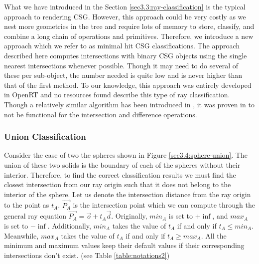 \documentclass[a4paper,11pt,oneside]{article}
\begin{document}
What we have introduced in the Section \ref{sec3.3:ray-classification} is the typical approach to rendering CSG. However, this approach could be very costly as we nest more geometries in the tree and require lots of memory to store, classify, and combine a long chain of operations and primitives. Therefore, we introduce a new approach which we refer to as minimal hit CSG classifications. The approach described here computes intersections with binary CSG objects using the single nearest intersections whenever possible. Though it may need to do several of these per sub-object, the number needed is quite low and is never higher than that of the first method. To our knowledge, this approach was entirely developed in OpenRT and no resources found describe this type of ray classification. Though a relatively similar algorithm has been introduced in \cite{kensler_ray_2006}, it was proven in \cite{csg-xrt-renderer} to not be functional for the intersection and difference operations.

\subsubsection{Union Classification}

Consider the case of two the spheres shown in Figure \ref{sec3.4:sphere-union}. The union of these two solids is the boundary of each of the spheres without their interior. Therefore, to find the correct classification results we must find the closest intersection from our ray origin such that it does not belong to the interior of the sphere. Let us denote the intersection distance from the ray origin to the point as $t_A$. $\vec{P_A}$ is the intersection point which we can compute through the general ray equation $\vec{P_A} = \vec{o} + t_{A}\vec{d}$. Originally, $min_A$ is set to $+\inf$, and $max_A$ is set to $-\inf$. Additionally, $min_A$ takes the value of $t_A$ if and only if $t_A \leq min_A$. Meanwhile, $max_A$ takes the value of $t_A$ if and only if $t_A \geq max_A$. All the minimum and maximum values keep their default values if their corresponding intersections don't exist. (see Table \ref{table:notations2})
\end{document}
